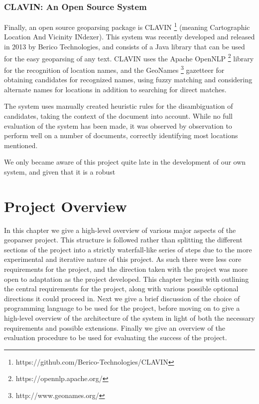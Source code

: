 \documentclass[12pt, a4paper]{report}
\begin{document}

\subsection{CLAVIN: An Open Source System}

Finally, an open source geoparsing package is CLAVIN \footnote{https://github.com/Berico-Technologies/CLAVIN} (meaning Cartographic Location And Vicinity INdexer). This system was recently developed and released in 2013 by Berico Technologies, and consists of a Java library that can be used for the easy geoparsing of any text. CLAVIN uses the Apache OpenNLP \footnote{https://opennlp.apache.org/} library for the recognition of location names, and the GeoNames \footnote{http://www.geonames.org/} gazetteer for obtaining candidates for recognized names, using fuzzy matching and considering alternate names for locations in addition to searching for direct matches.

The system uses manually created heuristic rules for the disambiguation of candidates, taking the context of the document into account. While no full evaluation of the system has been made, it was observed by observation to perform well on a number of documents, correctly identifying most locations mentioned.

We only became aware of this project quite late in the development of our own system, and given that it is a robust 

\chapter{Project Overview}

In this chapter we give a high-level overview of various major aspects of the geoparser project. This structure is followed rather than splitting the different sections of the project into a strictly waterfall-like series of steps due to the more experimental and iterative nature of this project. As such there were less core requirements for the project, and the direction taken with the project was more open to adaptation as the project developed. This chapter begins with outlining the central requirements for the project, along with various possible optional directions it could proceed in. Next we give a brief discussion of the choice of programming language to be used for the project, before moving on to give a high-level overview of the architecture of the system in light of both the necessary requirements and possible extensions. Finally we give an overview of the evaluation procedure to be used for evaluating the success of the project.
\end{document}

